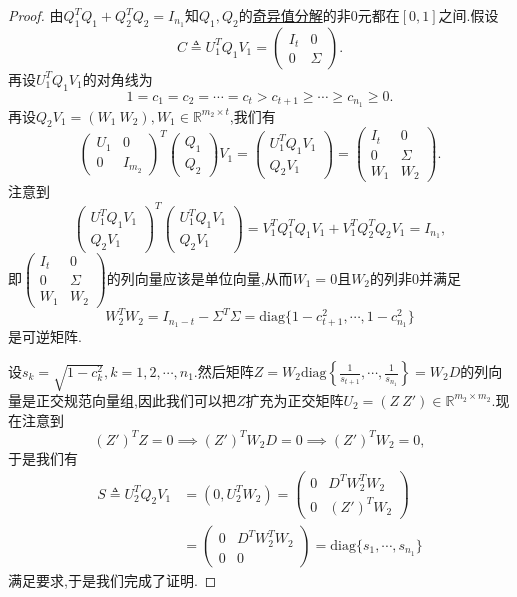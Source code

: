 \documentclass[../../main.tex]{subfiles}
\begin{document}
\begin{proof}
由\( Q_1^T Q_1 + Q_2^T Q_2 = I_{n_1} \)知\( Q_1, Q_2 \)的\hyperref[theorem:奇异值分解]{奇异值分解}的非0元都在\([0, 1]\)之间.假设
\[
C \triangleq U_1^T Q_1 V_1 = \begin{pmatrix}
I_t & 0 \\
0 & \Sigma
\end{pmatrix}.
\]
再设\( U_1^T Q_1 V_1 \)的对角线为
\[
1 = c_1 = c_2 = \cdots = c_t > c_{t + 1} \geqslant  \cdots \geqslant  c_{n_1} \geqslant  0.
\]
再设\( Q_2 V_1 = (W_1\ W_2), W_1 \in \mathbb{R}^{m_2 \times t} \),我们有
\[
\begin{pmatrix}
U_1 & 0 \\
0 & I_{m_2}
\end{pmatrix}^T \begin{pmatrix}
Q_1 \\
Q_2
\end{pmatrix} V_1 = \begin{pmatrix}
U_1^T Q_1 V_1 \\
Q_2 V_1
\end{pmatrix} = \begin{pmatrix}
I_t & 0 \\
0 & \Sigma \\
W_1 & W_2
\end{pmatrix}.
\]
注意到
\[
\begin{pmatrix}
U_1^T Q_1 V_1 \\
Q_2 V_1
\end{pmatrix}^T \begin{pmatrix}
U_1^T Q_1 V_1 \\
Q_2 V_1
\end{pmatrix} = V_1^T Q_1^T Q_1 V_1 + V_1^T Q_2^T Q_2 V_1 = I_{n_1},
\]
即\( \begin{pmatrix}
I_t & 0 \\
0 & \Sigma \\
W_1 & W_2
\end{pmatrix} \)的列向量应该是单位向量,从而\( W_1 = 0 \)且\( W_2 \)的列非0并满足
\[
W_2^T W_2 = I_{n_1 - t} - \Sigma^T \Sigma = \text{diag}\{1 - c_{t + 1}^2, \cdots, 1 - c_{n_1}^2\}
\]
是可逆矩阵.

设\( s_k = \sqrt{1 - c_k^2}, k = 1, 2, \cdots, n_1 \).然后矩阵\( Z = W_2 \text{diag}\left\{ \frac{1}{s_{t + 1}}, \cdots, \frac{1}{s_{n_1}} \right\} = W_2 D \)的列向量是正交规范向量组,因此我们可以把\( Z \)扩充为正交矩阵\( U_2 = (Z\ Z') \in \mathbb{R}^{m_2 \times m_2} \).现在注意到
\[
(Z')^T Z = 0 \implies (Z')^T W_2 D = 0 \implies (Z')^T W_2 = 0,
\]
于是我们有
\[
\begin{aligned}
S \triangleq U_2^T Q_2 V_1 &= (0, U_2^T W_2) = \begin{pmatrix}
0 & D^T W_2^T W_2 \\
0 & (Z')^T W_2
\end{pmatrix} \\
&= \begin{pmatrix}
0 & D^T W_2^T W_2 \\
0 & 0
\end{pmatrix} = \text{diag}\{s_1, \cdots, s_{n_1}\}
\end{aligned}
\]
满足要求,于是我们完成了证明.
\end{proof}
\end{document}
